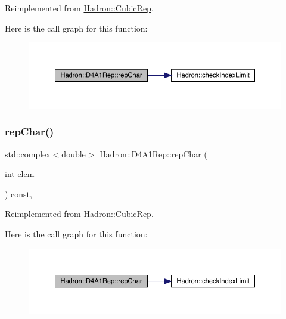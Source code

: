Reimplemented from \mbox{\hyperlink{structHadron_1_1CubicRep_af45227106e8e715e84b0af69cd3b36f8}{Hadron\+::\+Cubic\+Rep}}.

Here is the call graph for this function\+:
\nopagebreak
\begin{figure}[H]
\begin{center}
\leavevmode
\includegraphics[width=350pt]{d8/d02/structHadron_1_1D4A1Rep_a45938f0cd557c639eedba39b63fabe29_cgraph}
\end{center}
\end{figure}
\mbox{\label{structHadron_1_1D4A1Rep_a45938f0cd557c639eedba39b63fabe29}} 
\subsubsection{\texorpdfstring{repChar()}{repChar()}\hspace{0.1cm}{\footnotesize\ttfamily [3/3]}}
{\footnotesize\ttfamily std\+::complex$<$double$>$ Hadron\+::\+D4\+A1\+Rep\+::rep\+Char (\begin{DoxyParamCaption}\item[{int}]{elem }\end{DoxyParamCaption}) const\hspace{0.3cm}{\ttfamily [inline]}, {\ttfamily [virtual]}}



Reimplemented from \mbox{\hyperlink{structHadron_1_1CubicRep_af45227106e8e715e84b0af69cd3b36f8}{Hadron\+::\+Cubic\+Rep}}.

Here is the call graph for this function\+:
\nopagebreak
\begin{figure}[H]
\begin{center}
\leavevmode
\includegraphics[width=350pt]{d8/d02/structHadron_1_1D4A1Rep_a45938f0cd557c639eedba39b63fabe29_cgraph}
\end{center}
\end{figure}
\mbox{\label{structHadron_1_1D4A1Rep_a4dca745781630db08cee88f37cae21b6}} 
